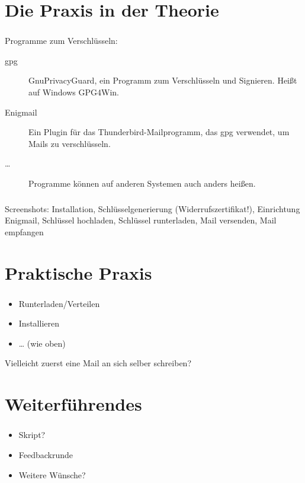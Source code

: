 \documentclass[compress]{beamer}
\begin{document}
\section{Die Praxis in der Theorie}
\label{sec-1-1-5}

\begin{frame}
  \frametitle{\insertsection}
  Programme zum Verschlüsseln:

  \begin{description}
  \item[gpg] \alert{G}nu\alert{P}rivacy\alert{G}uard, ein Programm zum
    Verschlüsseln und Signieren.  Heißt auf Windows \alert{GPG4Win}.
  \item[Enigmail] Ein Plugin für das Thunderbird-Mailprogramm, das gpg
    verwendet, um Mails zu verschlüsseln.
  \item[\ldots] Programme können auf anderen Systemen auch anders
    heißen.
  \end{description}

\end{frame}

\begin{frame}
  \frametitle{\insertsection}
  Screenshots: Installation, Schlüsselgenerierung
  (Widerrufszertifikat!), Einrichtung Enigmail, Schlüssel hochladen,
  Schlüssel runterladen, Mail versenden, Mail empfangen
\end{frame}
\section{Praktische Praxis}
\label{sec-1-1-6}

\begin{frame}
  \frametitle{\insertsection}
  \begin{itemize}
  \item Runterladen/Verteilen
  \item Installieren
  \item \ldots{} (wie oben)
  \end{itemize}
  Vielleicht zuerst eine Mail an sich selber schreiben?
\end{frame}

\section{Weiterführendes}
\label{sec-1-1-7}

\begin{frame}
  \frametitle{\insertsection}
  \begin{itemize}
  \item Skript?
  \item Feedbackrunde
  \item Weitere Wünsche?
  \end{itemize}
\end{frame}
\end{document}
